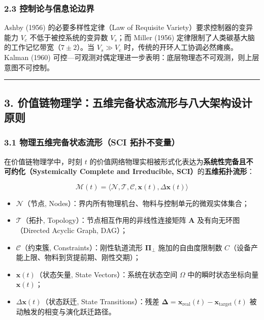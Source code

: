 \documentclass[
]{article}
\providecommand{\tightlist}{%
  \setlength{\itemsep}{0pt}\setlength{\parskip}{0pt}}
\begin{document}
\subsubsection{2.3
控制论与信息论边界}\label{ux63a7ux5236ux8bbaux4e0eux4fe1ux606fux8bbaux8fb9ux754c}

Ashby (1956) 的必要多样性定律（Law of Requisite
Variety）要求控制器的变异能力 \(V_c\) 不低于被控系统的变异数 \(V_s\)；而
Miller (1956) 定律限制了人类碳基大脑的工作记忆带宽（\(7 \pm 2\)）。当
\(V_s \gg V_c\) 时，传统的开环人工协调必然瘫痪。Kalman (1960)
可控---可观测对偶定理进一步表明：底层物理态不可观测，则上层意图不可控制。

\begin{center}\rule{0.5\linewidth}{0.5pt}\end{center}

\subsection{3.
价值链物理学：五维完备状态流形与八大架构设计原则}\label{ux4ef7ux503cux94feux7269ux7406ux5b66ux4e94ux7ef4ux5b8cux5907ux72b6ux6001ux6d41ux5f62ux4e0eux516bux5927ux67b6ux6784ux8bbeux8ba1ux539fux5219}

\subsubsection{3.1 物理五维完备状态流形（SCI
拓扑不变量）}\label{ux7269ux7406ux4e94ux7ef4ux5b8cux5907ux72b6ux6001ux6d41ux5f62sci-ux62d3ux6251ux4e0dux53d8ux91cf}

在价值链物理学中，时刻 \(t\)
的价值网络物理实相被形式化表达为\textbf{系统性完备且不可约化（Systemically
Complete and Irreducible, SCI）}的\textbf{五维拓扑流形}：

\[\mathcal{M}(t) = \langle \mathcal{N}, \mathcal{T}, \mathcal{C}, \mathbf{x}(t), \Delta\mathbf{x}(t) \rangle\]

\begin{itemize}
\tightlist
\item
  \(\mathcal{N}\)（节点,
  Nodes）：界内所有物理机台、物料与控制单元的微观实体集合；
\item
  \(\mathcal{T}\)（拓扑, Topology）：节点相互作用的非线性连接矩阵
  \(\mathbf{A}\) 及有向无环图（Directed Acyclic Graph, DAG）；
\item
  \(\mathcal{C}\)（约束簇, Constraints）：刚性轨道流形
  \(\mathbf{\Pi}_\bot\) 施加的自由度限制数
  \(C\)（设备产能上限、物料到货提前期、刚性交期）；
\item
  \(\mathbf{x}(t)\)（状态矢量, State Vectors）：系统在状态空间
  \(\Omega\) 中的瞬时状态坐标向量 \(\mathbf{x}(t)\)；
\item
  \(\Delta\mathbf{x}(t)\)（状态跃迁, State Transitions）：残差
  \(\mathbf{\Delta} = \mathbf{x}_{\mathrm{real}}(t) - \mathbf{x}_{\mathrm{target}}(t)\)
  被动触发的相变与演化跃迁路径。
\end{itemize}
\end{document}
